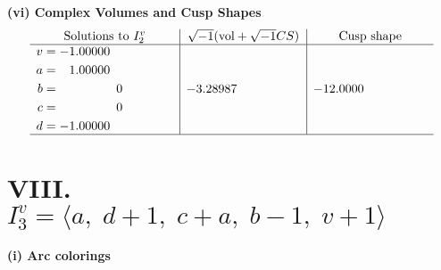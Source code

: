\documentclass[1p]{elsarticle_modified}
\theoremstyle{definition}
\newcommand{\I}{\sqrt{-1}}
\begin{document}
\newpage\flushleft \textbf{(vi) Complex Volumes and Cusp Shapes}
$$\begin{array}{c|c|c}  
\text{Solutions to }I^v_{2}& \I (\text{vol} + \sqrt{-1}CS) & \text{Cusp shape}\\
 \hline 
\begin{aligned}
v &= -1.00000\phantom{ +0.000000I} \\
a &= \phantom{-}1.00000\phantom{ +0.000000I} \\
b &= \phantom{-0.000000 } 0 \\
c &= \phantom{-0.000000 } 0 \\
d &= -1.00000\phantom{ +0.000000I}\end{aligned}
 & -3.28987\phantom{ +0.000000I} & -12.0000\phantom{ +0.000000I}\\
 \hline 
 \end{array}$$\newpage\newpage\renewcommand{\arraystretch}{1}
\centering \section*{VIII. $I^v_{3}= \langle a,\;d+1,\;c+a,\;b-1,\;v+1 \rangle$}
\flushleft \textbf{(i) Arc colorings}\\
\end{document}
